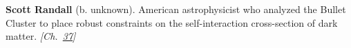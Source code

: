 \textbf{Scott Randall} (b. unknown). American astrophysicist who analyzed the Bullet Cluster to place robust constraints on the self-interaction cross-section of dark matter. \emph{[Ch.~\hyperref[ch:darkmatterevidence]{37}]}

